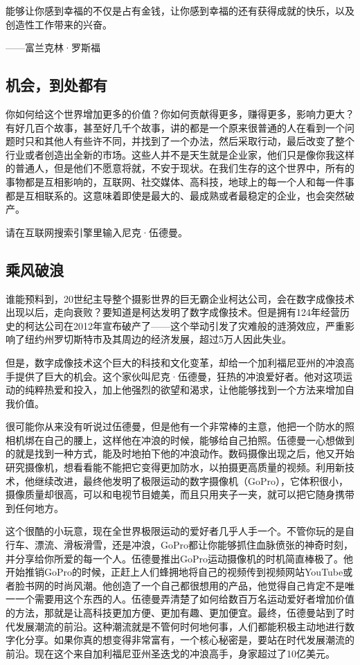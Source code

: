\begin{BookQuote}
能够让你感到幸福的不仅是占有金钱，让你感到幸福的还有获得成就的快乐，以及创造性工作带来的兴奋。

\hfill ——富兰克林·罗斯福
\end{BookQuote}

\subsection{机会，到处都有}

你如何给这个世界增加更多的价值？你如何贡献得更多，赚得更多，影响力更大？有好几百个故事，甚至好几千个故事，讲的都是一个原来很普通的人在看到一个问题时只和其他人有些许不同，并找到了一个办法，然后采取行动，最后改变了整个行业或者创造出全新的市场。这些人并不是天生就是企业家，他们只是像你我这样的普通人，但是他们不愿意将就，不安于现状。在我们生存的这个世界中，所有的事物都是互相影响的，互联网、社交媒体、高科技，地球上的每一个人和每一件事都是互相联系的。这意味着即使是最大的、最成熟或者最稳定的企业，也会突然破产。

请在互联网搜索引擎里输入尼克·伍德曼。

\subsection{乘风破浪}

谁能预料到，20世纪主导整个摄影世界的巨无霸企业柯达公司，会在数字成像技术出现以后，走向衰败？要知道是柯达发明了数字成像技术。但是拥有124年经营历史的柯达公司在2012年宣布破产了——这个举动引发了灾难般的涟漪效应，严重影响了纽约州罗切斯特市及其周边的经济发展，超过5万人因此失业。

但是，数字成像技术这个巨大的科技和文化变革，却给一个加利福尼亚州的冲浪高手提供了巨大的机会。这个家伙叫尼克·伍德曼，狂热的冲浪爱好者。他对这项运动的纯粹热爱和投入，加上他强烈的欲望和渴求，让他能够找到一个方法来增加自我价值。

很可能你从来没有听说过伍德曼，但是他有一个非常棒的主意，他把一个防水的照相机绑在自己的腰上，这样他在冲浪的时候，能够给自己拍照。伍德曼一心想做到的就是找到一种方式，能及时地拍下他的冲浪动作。数码摄像出现之后，他又开始研究摄像机，想看看能不能把它变得更加防水，以拍摄更高质量的视频。利用新技术，他继续改进，最终他发明了极限运动的数字摄像机（GoPro），它体积很小，摄像质量却很高，可以和电视节目媲美，而且只用夹子一夹，就可以把它随身携带到任何地方。

这个很酷的小玩意，现在全世界极限运动的爱好者几乎人手一个。不管你玩的是自行车、漂流、滑板滑雪，还是冲浪，GoPro都让你能够抓住血脉偾张的神奇时刻，并分享给你所爱的每一个人。伍德曼推出GoPro运动摄像机的时机简直棒极了。他开始推销GoPro的时候，正赶上人们蜂拥地将自己的视频传到视频网站YouTube或者脸书网的时尚风潮。他创造了一个自己都很想用的产品，他觉得自己肯定不是唯一一个需要用这个东西的人。伍德曼弄清楚了如何给数百万名运动爱好者增加价值的方法，那就是让高科技更加方便、更加有趣、更加便宜。最终，伍德曼站到了时代发展潮流的前沿。这种潮流就是不管何时何地何事，人们都能积极主动地进行数字化分享。如果你真的想变得非常富有，一个核心秘密是，要站在时代发展潮流的前沿。现在这个来自加利福尼亚州圣迭戈的冲浪高手，身家超过了10亿美元。

